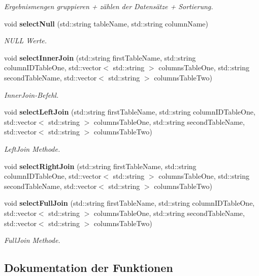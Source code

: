 \begin{DoxyCompactItemize}
\begin{DoxyCompactList}\small\item\em Ergebnismengen gruppieren + zählen der Datensätze + Sortierung. \end{DoxyCompactList}\item 
void \textbf{ select\+Null} (std\+::string table\+Name, std\+::string column\+Name)
\begin{DoxyCompactList}\small\item\em N\+U\+LL Werte. \end{DoxyCompactList}\item 
void \textbf{ select\+Inner\+Join} (std\+::string first\+Table\+Name, std\+::string column\+I\+D\+Table\+One, std\+::vector$<$ std\+::string $>$ columns\+Table\+One, std\+::string second\+Table\+Name, std\+::vector$<$ std\+::string $>$ columns\+Table\+Two)
\begin{DoxyCompactList}\small\item\em Inner\+Join-\/\+Befehl. \end{DoxyCompactList}\item 
void \textbf{ select\+Left\+Join} (std\+::string first\+Table\+Name, std\+::string column\+I\+D\+Table\+One, std\+::vector$<$ std\+::string $>$ columns\+Table\+One, std\+::string second\+Table\+Name, std\+::vector$<$ std\+::string $>$ columns\+Table\+Two)
\begin{DoxyCompactList}\small\item\em Left\+Join Methode. \end{DoxyCompactList}\item 
void \textbf{ select\+Right\+Join} (std\+::string first\+Table\+Name, std\+::string column\+I\+D\+Table\+One, std\+::vector$<$ std\+::string $>$ columns\+Table\+One, std\+::string second\+Table\+Name, std\+::vector$<$ std\+::string $>$ columns\+Table\+Two)
\item 
void \textbf{ select\+Full\+Join} (std\+::string first\+Table\+Name, std\+::string column\+I\+D\+Table\+One, std\+::vector$<$ std\+::string $>$ columns\+Table\+One, std\+::string second\+Table\+Name, std\+::vector$<$ std\+::string $>$ columns\+Table\+Two)
\begin{DoxyCompactList}\small\item\em Full\+Join Methode. \end{DoxyCompactList}\end{DoxyCompactItemize}


\subsection{Dokumentation der Funktionen}
\mbox{\label{selection_request_8cpp_a01bd0062142a17ad04b7101bac7b38b6}} 
